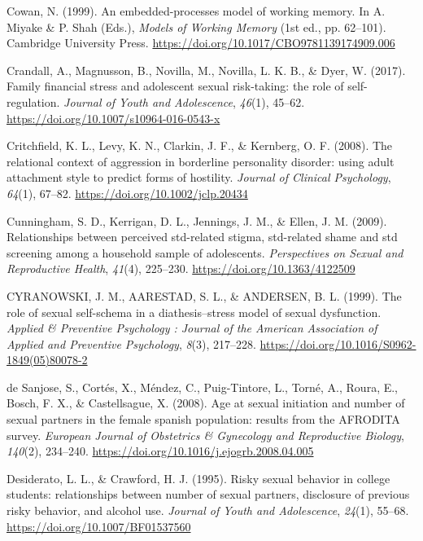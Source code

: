 \documentclass[
  english,
  donotrepeattitle,doc, 12pt, a4paper,floatsintext]{apa7}
\newlength{\cslhangindent}
\newlength{\cslentryspacingunit} %
\newenvironment{CSLReferences}[2] %
 {%
  \setlength{\parindent}{0pt}
  \ifodd #1
  \let\oldpar\par
  \def\par{\hangindent=\cslhangindent\oldpar}
  \fi
  \setlength{\parskip}{#2\cslentryspacingunit}
 }%
 {}
\begin{document}
\begin{CSLReferences}{1}{0}
\leavevmode{}%
Cowan, N. (1999). An embedded-processes model of working memory. In A. Miyake \& P. Shah (Eds.), \emph{Models of Working Memory} (1st ed., pp. 62--101). Cambridge University Press. \url{https://doi.org/10.1017/CBO9781139174909.006}

\leavevmode{}%
Crandall, A., Magnusson, B., Novilla, M., Novilla, L. K. B., \& Dyer, W. (2017). Family financial stress and adolescent sexual risk-taking: the role of self-regulation. \emph{Journal of Youth and Adolescence}, \emph{46}(1), 45--62. \url{https://doi.org/10.1007/s10964-016-0543-x}

\leavevmode{}%
Critchfield, K. L., Levy, K. N., Clarkin, J. F., \& Kernberg, O. F. (2008). The relational context of aggression in borderline personality disorder: using adult attachment style to predict forms of hostility. \emph{Journal of Clinical Psychology}, \emph{64}(1), 67--82. \url{https://doi.org/10.1002/jclp.20434}

\leavevmode{}%
Cunningham, S. D., Kerrigan, D. L., Jennings, J. M., \& Ellen, J. M. (2009). Relationships between perceived std-related stigma, std-related shame and std screening among a household sample of adolescents. \emph{Perspectives on Sexual and Reproductive Health}, \emph{41}(4), 225--230. \url{https://doi.org/10.1363/4122509}

\leavevmode{}%
CYRANOWSKI, J. M., AARESTAD, S. L., \& ANDERSEN, B. L. (1999). The role of sexual self-schema in a diathesis--stress model of sexual dysfunction. \emph{Applied \& Preventive Psychology : Journal of the American Association of Applied and Preventive Psychology}, \emph{8}(3), 217--228. \url{https://doi.org/10.1016/S0962-1849(05)80078-2}

\leavevmode{}%
de Sanjose, S., Cortés, X., Méndez, C., Puig-Tintore, L., Torné, A., Roura, E., Bosch, F. X., \& Castellsague, X. (2008). Age at sexual initiation and number of sexual partners in the female spanish population: results from the AFRODITA survey. \emph{European Journal of Obstetrics \& Gynecology and Reproductive Biology}, \emph{140}(2), 234--240. \url{https://doi.org/10.1016/j.ejogrb.2008.04.005}

\leavevmode{}%
Desiderato, L. L., \& Crawford, H. J. (1995). Risky sexual behavior in college students: relationships between number of sexual partners, disclosure of previous risky behavior, and alcohol use. \emph{Journal of Youth and Adolescence}, \emph{24}(1), 55--68. \url{https://doi.org/10.1007/BF01537560}


\end{CSLReferences}
\end{document}
